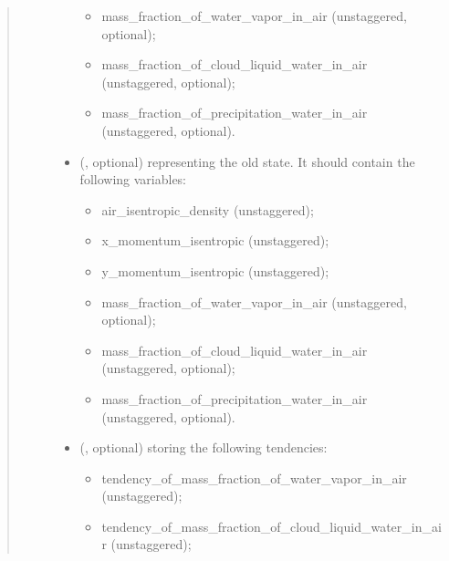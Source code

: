 \documentclass[letterpaper,10pt,english]{sphinxmanual}
\begin{document}
\begin{fulllineitems}
\begin{fulllineitems}
\begin{quote}
\begin{description}
\begin{itemize}
\begin{itemize}
\item {} 
mass\_fraction\_of\_water\_vapor\_in\_air (unstaggered, optional);

\item {} 
mass\_fraction\_of\_cloud\_liquid\_water\_in\_air (unstaggered, optional);

\item {} 
mass\_fraction\_of\_precipitation\_water\_in\_air (unstaggered, optional).

\end{itemize}


\item {} 
 (, optional) \textendash{} 
{\hyperref[\detokenize{api:storages.state_isentropic.StateIsentropic}]{}} representing the old state.
It should contain the following variables:
\begin{itemize}
\item {} 
air\_isentropic\_density (unstaggered);

\item {} 
x\_momentum\_isentropic (unstaggered);

\item {} 
y\_momentum\_isentropic (unstaggered);

\item {} 
mass\_fraction\_of\_water\_vapor\_in\_air (unstaggered, optional);

\item {} 
mass\_fraction\_of\_cloud\_liquid\_water\_in\_air (unstaggered, optional);

\item {} 
mass\_fraction\_of\_precipitation\_water\_in\_air (unstaggered, optional).

\end{itemize}


\item {} 
 (, optional) \textendash{} 
{\hyperref[\detokenize{api:storages.grid_data.GridData}]{}} storing the following tendencies:
\begin{itemize}
\item {} 
tendency\_of\_mass\_fraction\_of\_water\_vapor\_in\_air (unstaggered);

\item {} 
tendency\_of\_mass\_fraction\_of\_cloud\_liquid\_water\_in\_air (unstaggered);


\end{itemize}
\end{itemize}
\end{description}
\end{quote}
\end{fulllineitems}
\end{fulllineitems}
\end{document}
